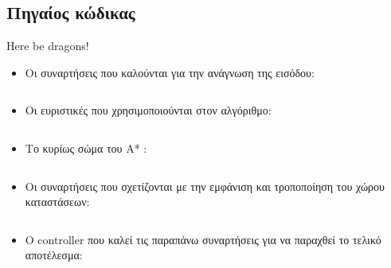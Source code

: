 \documentclass[a4paper,9pt]{article}
\begin{document}
\subsection{Πηγαίος κώδικας}
Here be dragons!
\begin{itemize}
\item
Οι συναρτήσεις που καλούνται για την ανάγνωση της εισόδου:
\inputminted[linenos,fontsize=\footnotesize,frame=leftline]{python}{files/inparser.py}

\item
Οι ευριστικές που χρησιμοποιούνται στον αλγόριθμο:
\inputminted[linenos,fontsize=\footnotesize,frame=leftline]{python}{files/heuristics.py}

\item
Το κυρίως σώμα του A* :
\inputminted[linenos,fontsize=\footnotesize,frame=leftline]{python}{files/astar.py}

\item
Οι συναρτήσεις που σχετίζονται με την εμφάνιση και τροποποίηση του χώρου
καταστάσεων:
\inputminted[linenos,fontsize=\footnotesize,frame=leftline]{python}{files/grids.py}

\item
Ο controller που καλεί τις παραπάνω συναρτήσεις για να παραχθεί το τελικό
αποτέλεσμα:
\inputminted[linenos,fontsize=\footnotesize,frame=leftline]{python}{files/controller.py}
\end{itemize}
\end{document}
